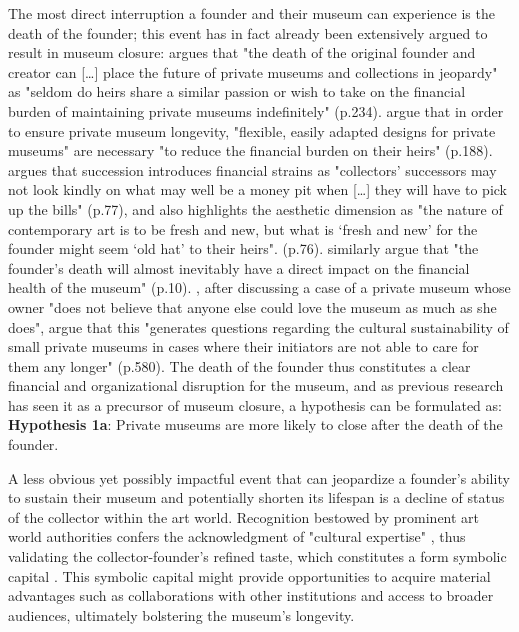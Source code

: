 \documentclass[12pt]{article}
\begin{document}
The most direct interruption a founder and their museum can experience is the death of the founder; this event has in fact already been extensively argued to result in museum closure:
\textcite{Walker_2019_collector} argues that "the death of the original founder and creator can [\ldots{}] place the future of private museums and collections in jeopardy" as "seldom do heirs share a similar passion or wish to take on the financial burden of maintaining private museums indefinitely" (p.234). 
\textcite{Bechtler_Imhof_2018_future} argue that in order to ensure private museum longevity, "flexible, easily adapted designs for private museums" are necessary "to reduce the financial burden on their heirs" (p.188).
\textcite{Adam_2021_rise} argues that succession introduces financial strains as "collectors’ successors may not look kindly on what may well be a money pit when [\ldots{}] they will have to pick up the bills" (p.77), and also highlights the aesthetic dimension as "the nature of contemporary art is to be fresh and new, but what is ‘fresh and new’ for the founder might seem ‘old hat’ to their heirs". (p.76).
\textcite{Velthuis_Gera_2024_fragility} similarly argue that "the founder’s death will almost inevitably have a direct impact on the financial health of the museum" (p.10).
\textcite{StylianouLambert_etal_2014_museums}, after discussing a case of a private museum whose owner "does not believe that anyone else could love the museum as much as she does", argue that this "generates questions regarding the cultural sustainability of small private museums in cases where their initiators are not able to care for them any longer" (p.580).
The death of the founder thus constitutes a clear financial and organizational disruption for the museum, and as previous research has seen it as a precursor of museum closure, a hypothesis can be formulated as:
\textbf{Hypothesis 1a}: Private museums are more likely to close after the death of the founder.



A less obvious yet possibly impactful event that can jeopardize a founder's ability to sustain their museum and potentially shorten its lifespan is a decline of status of the collector within the art world.
Recognition bestowed by prominent art world authorities confers the acknowledgment of "cultural expertise" \parencite[p.1486]{Braden_2016_recognition}, thus validating the collector-founder's refined taste, which constitutes a form symbolic capital \parencite{Bourdieu_1993_production}.
This symbolic capital might provide opportunities to acquire material advantages such as collaborations with other institutions and access to broader audiences, ultimately bolstering the museum's longevity.
\end{document}
